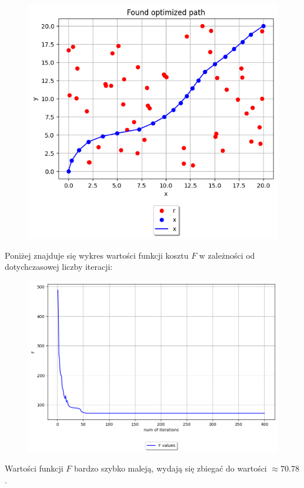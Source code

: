 \documentclass{article}
\begin{document}
\begin{figure}[H]
  \includegraphics[width=\linewidth]{figures/5.png}
\end{figure}

\newpage
Poniżej znajduje się wykres wartości funkcji kosztu $F$ w zależności od dotychczasowej
liczby iteracji:

\begin{figure}[H]
  \includegraphics[width=\linewidth]{figures/F.png}
\end{figure}

Wartości funkcji $F$ bardzo szybko maleją, wydają się zbiegać do wartości $\approx 70.78$.
\end{document}
